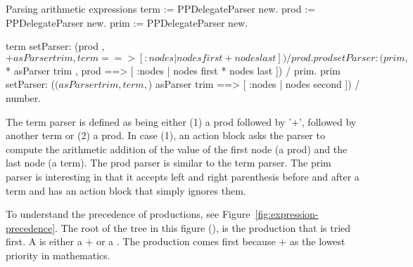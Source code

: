 \documentclass[a4paper,10pt,twoside]{book}
\begin{document}
\begin{script}[arithmetic]{Parsing arithmetic expressions}
term := PPDelegateParser new.
prod := PPDelegateParser new.
prim := PPDelegateParser new.
 
term setParser: (prod , $+ asParser trim , term ==> [ :nodes | nodes first + nodes last ])
                     / prod.
prod setParser: (prim , $* asParser trim , prod ==> [ :nodes | nodes first * nodes last ])
                     / prim.
prim setParser: ($( asParser trim , term , $) asParser trim ==> [ :nodes | nodes second ])
                     / number.
\end{script}

The term parser is defined as being either (1) a prod followed by '+',
followed by another term or (2) a prod. In case (1), an action block
asks the parser to compute the arithmetic addition of the value of the
first node (a prod) and the last node (a term). The prod parser is
similar to the term parser. The prim parser is interesting in that it
accepts left and right parenthesis before and after a term and has an
action block that simply ignores them.

To understand the precedence of productions, see
Figure~\ref{fig:expression-precedence}. The root of the tree in this
figure (), is the production that is tried first. A 
is either a $+$ or a . The  production comes first
because $+$ as the lowest priority in mathematics.
\end{document}

